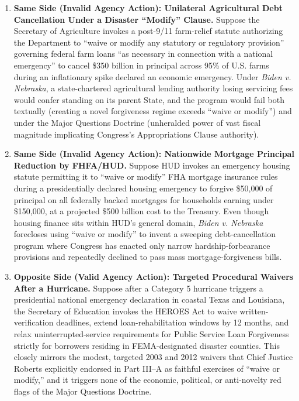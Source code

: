 \documentclass[12pt]{article}
\begin{document}
\begin{enumerate}
  \item \textbf{Same Side (Invalid Agency Action): Unilateral Agricultural Debt Cancellation Under a Disaster ``Modify'' Clause.} Suppose the Secretary of Agriculture invokes a post-9/11 farm-relief statute authorizing the Department to ``waive or modify any statutory or regulatory provision'' governing federal farm loans ``as necessary in connection with a national emergency'' to cancel \$350 billion in principal across 95\% of U.S. farms during an inflationary spike declared an economic emergency. Under \textit{Biden v. Nebraska}, a state-chartered agricultural lending authority losing servicing fees would confer standing on its parent State, and the program would fail both textually (creating a novel forgiveness regime exceeds ``waive or modify'') and under the Major Questions Doctrine (unheralded power of vast fiscal magnitude implicating Congress's Appropriations Clause authority).

  \item \textbf{Same Side (Invalid Agency Action): Nationwide Mortgage Principal Reduction by FHFA/HUD.} Suppose HUD invokes an emergency housing statute permitting it to ``waive or modify'' FHA mortgage insurance rules during a presidentially declared housing emergency to forgive \$50,000 of principal on all federally backed mortgages for households earning under \$150,000, at a projected \$500 billion cost to the Treasury. Even though housing finance sits within HUD's general domain, \textit{Biden v. Nebraska} forecloses using ``waive or modify'' to invent a sweeping debt-cancellation program where Congress has enacted only narrow hardship-forbearance provisions and repeatedly declined to pass mass mortgage-forgiveness bills.

  \item \textbf{Opposite Side (Valid Agency Action): Targeted Procedural Waivers After a Hurricane.} Suppose after a Category 5 hurricane triggers a presidential national emergency declaration in coastal Texas and Louisiana, the Secretary of Education invokes the HEROES Act to waive written-verification deadlines, extend loan-rehabilitation windows by 12 months, and relax uninterrupted-service requirements for Public Service Loan Forgiveness strictly for borrowers residing in FEMA-designated disaster counties. This closely mirrors the modest, targeted 2003 and 2012 waivers that Chief Justice Roberts explicitly endorsed in Part III--A as faithful exercises of ``waive or modify,'' and it triggers none of the economic, political, or anti-novelty red flags of the Major Questions Doctrine.


\end{enumerate}
\end{document}
